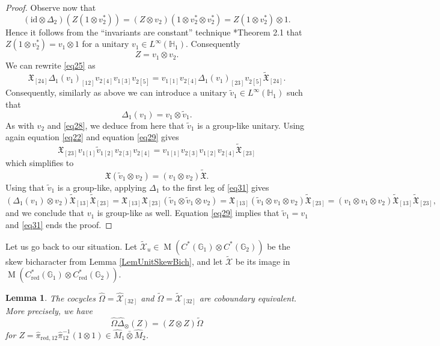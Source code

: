 \documentclass[reqno]{amsart}
\numberwithin{equation}{section}
\newtheorem{Lem}[Theorem]{Lemma}
\newcommand{\id}{\mathrm{id}}
\newcommand{\G}{\mathbb{G}}
\newcommand{\Hh}{\mathbb{H}}
\newcommand{\mcX}{\mathcal{X}}
\newcommand{\red}{\mathrm{red}}
\newcommand{\mc}{\mathcal}
\newcommand{\wh}{\widehat}
\newcommand{\Mult}{\operatorname{M}}
\newcommand{\mf}{\mathfrak}
\begin{document}
\begin{proof}
Observe now that 
\[
(\id\otimes \Delta_2)(Z (1\otimes v_2^*))=
(Z\otimes v_2)(1\otimes v_2^*\otimes v_2^*)=
Z(1\otimes v_2^*)\otimes 1.
\]
Hence it follows from the ``invariants are constant'' technique \cite{Daw12}*{Theorem 2.1} that $Z(1\otimes v_2^*)=v_1\otimes 1$ for a unitary $v_1\in L^{\infty}(\Hh_1)$. Consequently \begin{equation}\label{eq30}
Z=v_1\otimes v_2.
\end{equation}
We can rewrite \eqref{eq25} as
\[
\mf{X}_{[24]} \Delta_1(v_1)_{[12]} v_{2 [4]}
v_{1 [3]} v_{2[5]} = 
v_{1[1]} v_{2[4]}
\Delta_1(v_1)_{[23]} v_{2 [5]}
\widetilde{\mf{X}}_{[24]}.
\]
Consequently, similarly as above we can introduce a unitary $\tilde{v}_1\in L^{\infty}(\Hh_1)$ such that 
\begin{equation}\label{eq29}
\Delta_1(v_1)=v_1\otimes \tilde{v}_1.
\end{equation}
As with $v_2$ and \eqref{eq28}, we deduce from here that $\tilde{v}_1$ is a group-like unitary. Using again equation \eqref{eq22} and equation \eqref{eq29} gives
\[
\mf{X}_{[23]} v_{1[1]} \tilde{v}_{1 [2]}
v_{2[3]} v_{2[4]}=
v_{1[1]}  v_{2 [3]}
v_{1[2]} v_{2[4]}\widetilde{\mf{X}}_{[23]}
\]
which simplifies to
\begin{equation}\label{eq31}
\mf{X}  (\tilde{v}_1\otimes v_{2}) =
(v_{1}\otimes  v_{2 })
 \widetilde{\mf{X}}.
 \end{equation}
Using that $\tilde{v}_1$ is a group-like, applying $\Delta_1$ to the first leg of \eqref{eq31} gives
\[
(\Delta_1(v_1)\otimes v_2)\widetilde{\mf{X}}_{[13]}
\widetilde{\mf{X}}_{[23]}=
\mf{X}_{[13]} \mf{X}_{[23]}
(\tilde{v}_1\otimes \tilde{v}_1\otimes v_2)=
\mf{X}_{[13]} 
(\tilde{v}_1\otimes v_1\otimes v_2)
\widetilde{\mf{X}}_{[23]}
=
(v_1\otimes v_1\otimes v_2)
\widetilde{\mf{X}}_{[13]} 
\widetilde{\mf{X}}_{[23]},
\]
and we conclude that $v_1$ is group-like as well. Equation \eqref{eq29} implies that $\tilde{v}_1=v_1$ and \eqref{eq31} ends the proof.
\end{proof}

Let us go back to our situation. Let $\widetilde{\mcX}_u\in \Mult(C^*(\G_1)\otimes C^*(\G_2))$ be the skew bicharacter from Lemma \ref{LemUnitSkewBich}, and let $\widetilde{\mcX}$ be its image in $\Mult(C^*_{\red}(\G_1)\otimes C^*_{\red}(\G_2))$. 
\begin{Lem}\label{lemma7}
The cocycles $\hat\Omega=\wh{\mc{X}}_{[32]}$ and $\widetilde{\Omega}=\widetilde{\mc{X}}_{[32]}$ are coboundary equivalent. More precisely, we have
\[
\hat{\Omega}\hat{\Delta}_{\otimes}(Z)=(Z\otimes Z) \widetilde{\Omega} 
\]
for $Z=\hat{\pi}_{\red,12}\hat{\pi}^{-1}_{12}(1\otimes 1)\in \hat{M}_1 \bar\otimes \hat{M}_2$.
\end{Lem}
\end{document}
